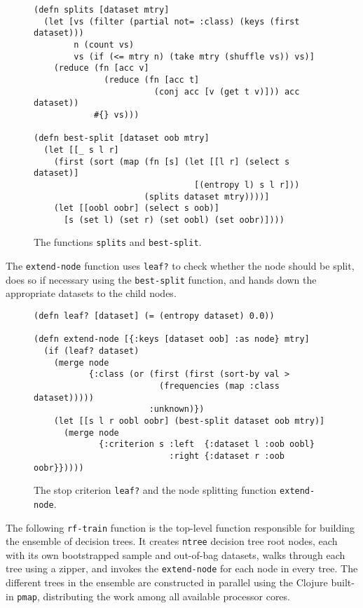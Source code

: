 \documentclass[a4paper,man,12pt,apacite,floatsintext,draftfirst]{apa6} %
\begin{document}
\begin{figure}[H]
\caption{The functions \texttt{splits} and \texttt{best-split}.}
\begin{verbatim}
(defn splits [dataset mtry]
  (let [vs (filter (partial not= :class) (keys (first dataset)))
        n (count vs)
        vs (if (<= mtry n) (take mtry (shuffle vs)) vs)]
    (reduce (fn [acc v]
              (reduce (fn [acc t]
                        (conj acc [v (get t v)])) acc dataset))
            #{} vs)))

(defn best-split [dataset oob mtry]
  (let [[_ s l r]
    (first (sort (map (fn [s] (let [[l r] (select s dataset)]
                                [(entropy l) s l r]))
                      (splits dataset mtry))))]
    (let [[oobl oobr] (select s oob)]
      [s (set l) (set r) (set oobl) (set oobr)])))
\end{verbatim}
\end{figure}

The \texttt{extend-node} function uses \texttt{leaf?} to check whether the node
should be split, does so if necessary using the \texttt{best-split} function, and
hands down the appropriate datasets to the child nodes.

\begin{figure}[H]
\caption{The stop criterion \texttt{leaf?} and the node splitting function \texttt{extend-node}.}
\begin{verbatim}
(defn leaf? [dataset] (= (entropy dataset) 0.0))

(defn extend-node [{:keys [dataset oob] :as node} mtry]
  (if (leaf? dataset)
    (merge node
           {:class (or (first (first (sort-by val >
                         (frequencies (map :class dataset)))))
                       :unknown)})
    (let [[s l r oobl oobr] (best-split dataset oob mtry)]
      (merge node
             {:criterion s :left  {:dataset l :oob oobl}
                           :right {:dataset r :oob oobr}}))))
\end{verbatim}
\end{figure}

The following \texttt{rf-train} function is the top-level function responsible for
building the ensemble of decision trees.
It creates \texttt{ntree} decision tree root nodes, each with its own bootstrapped sample
and out-of-bag datasets, walks through each tree using a zipper,
and invokes the \texttt{extend-node} for each node in every tree.
The different trees in the ensemble are constructed in parallel using the Clojure built-in \texttt{pmap},
distributing the work among all available processor cores.
\end{document}
